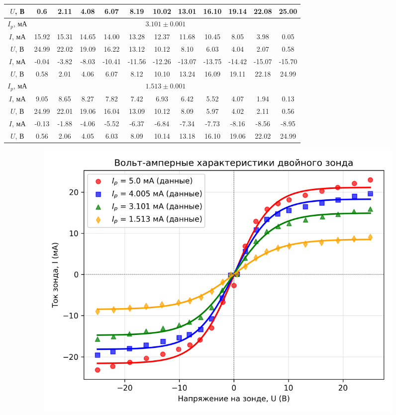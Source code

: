 \documentclass[a4paper, 12pt]{article}
\begin{document}
\begin{enumerate}
\begin{center}
\begin{tabular}{|c|c|c|c|c|c|c|c|c|c|c|c|}
            $U$, В & 0.6 & 2.11 & 4.08 & 6.07 & 8.19 & 10.02 & 13.01 & 16.10 & 19.14 & 22.08 & 25.00\\
            \hline
            $I_{p}$, мА & \multicolumn{11}{|c|}{$3.101\pm 0.001$}\\
            \hline
            $I$, мА & 15.92 & 15.31 & 14.65 & 14.00 & 13.28 & 12.37 & 11.68 & 10.45 & 8.05 & 3.98 & 0.05\\
            $U$, В & 24.99 & 22.02 & 19.09 & 16.22 & 13.12 & 10.12 & 8.10 & 6.03 & 4.04 & 2.07 & 0.58\\
            \hline
            $I$, мА & -0.04 & -3.82 & -8.03 & -10.41 & -11.56 & -12.26 & -13.07 & -13.75 & -14.42 & -15.07 & -15.70\\
            $U$, В & 0.58 & 2.01 & 4.06 & 6.07 & 8.12 & 10.10 & 13.24 & 16.09 & 19.11 & 22.18 & 24.99\\
            \hline
            $I_{p}$, мА & \multicolumn{11}{|c|}{$1.513\pm 0.001$}\\
            \hline
            $I$, мА & 9.05 & 8.65 & 8.27 & 7.82 & 7.42 & 6.93 & 6.42 & 5.52 & 4.07 & 1.94 & 0.13\\
            $U$, В & 24.99 & 22.01 & 19.06 & 16.04 & 13.09 & 10.12 & 8.09 & 5.97 & 4.02 & 2.11 & 0.56\\
            \hline
            $I$, мА & -0.13 & -1.88 & -4.06 & -5.52 & -6.37 & -6.84 & -7.34 & -7.73 & -8.16 & -8.56 & -8.95\\
            $U$, В & 0.56 & 2.06 & 4.05 & 6.03 & 8.09 & 10.14 & 13.18 & 16.10 & 19.06 & 22.02 & 24.99\\
            \hline
        \end{tabular}
    \end{center}
    \begin{figure}[htbp]
        \centering
        \begin{subfigure}{0.45\textwidth}
                \includegraphics[width=\linewidth]{zond.png}

\end{subfigure}
\end{figure}
\end{enumerate}
\end{document}
